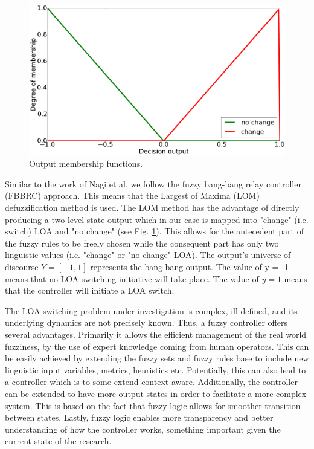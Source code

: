 \documentclass[a4paper,12pt,oneside,openright]{bhamthesis}
\begin{document}
\begin{figure}
	\centering
	\includegraphics[width=0.6\columnwidth]{chapter5_fig/fuzzy_output.png}
	\caption{Output membership functions.} 
	\label{fig:fuzzy_output}
\end{figure}

Similar to the work of Nagi et al. \citep{Nagi2009} we follow the fuzzy bang-bang relay controller (FBBRC) approach. This means that the Largest of Maxima (LOM) defuzzification method is used. The LOM method has the advantage of directly producing a two-level state output which in our case is mapped into "change" (i.e. switch) LOA and "no change" (see Fig. \ref{fig:fuzzy_output}). This allows for the antecedent part of the fuzzy rules to be freely chosen while the consequent part has only two linguistic values (i.e. "change" or "no change" LOA). The output's universe of discourse $Y = [-1,1]$ represents the bang-bang output. The value of y = -1 means that no LOA switching initiative will take place. The value of $y = 1$ means that the controller will initiate a LOA switch.

The LOA switching problem under investigation is complex, ill-defined, and its underlying dynamics are not precisely known. Thus, a fuzzy controller offers several advantages. Primarily it allows the efficient management of the real world fuzziness, by the use of expert knowledge coming from human operators. This can be easily achieved by extending the fuzzy sets and fuzzy rules base to include new linguistic input variables, metrics, heuristics etc. Potentially, this can also lead to a controller which is to some extend context aware. Additionally, the controller can be extended to have more output states in order to facilitate a more complex system. This is based on the fact that fuzzy logic allows for smoother transition between states. Lastly, fuzzy logic enables more transparency and better understanding of how the controller works, something important given the current state of the research.
\end{document}
